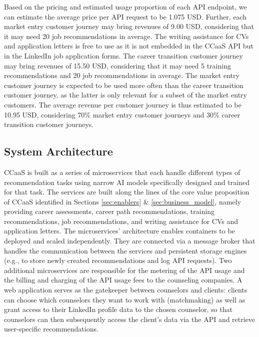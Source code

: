 Based on the pricing and estimated usage proportion of each API endpoint, we can estimate the
average price per API request to be 1.075 USD. Further, each market entry customer journey may
bring revenues of 9.00 USD, considering that it may need 20 job recommendations in average. The
writing assistance for CVs and application letters is free to use as it is not embedded in the
CCaaS API but in the LinkedIn job application forms. The career transition customer journey may
bring revenues of 15.50 USD, considering that it may need 5 training recommendations and 20 job
recommendations in average. The market entry customer journey is expected to be used more often
than the career transition customer journey, as the latter is only relevant for a subset of the
market entry customers. The average revenue per customer journey is thus estimated to be 10.95 USD,
considering 70\% market entry customer journeys and 30\% career transition customer journeys.

\subsection{System Architecture}
\label{subsec:system_architecture}

CCaaS is built as a series of microservices that each handle different types of recommendation
tasks using narrow AI models specifically designed and trained for that task. The services are 
built along the lines of the core value proposition of CCaaS identified in Sections \ref{sec:enablers}
\& \ref{sec:business_model}, namely providing career assessments, career path recommendations, training
recommendations, job recommendations, and writing assistance for CVs and application letters. The
microservices' architecture enables containers to be deployed and scaled independently. They are
connected via a message broker that handles the communication between the services and persistent
storage engines (e.g., to store newly created recommendations and log API requests). Two additional
microservices are responsible for the metering of the API usage and the billing and charging of the
API usage fees to the counseling companies. A web application serves as the gatekeeper between
counselors and clients: clients can choose which counselors they want to work with (matchmaking)
as well as grant access to their LinkedIn profile data to the chosen counselor, so that counselors 
can then subsequently access the client's data via the API and retrieve user-specific recommendations.

